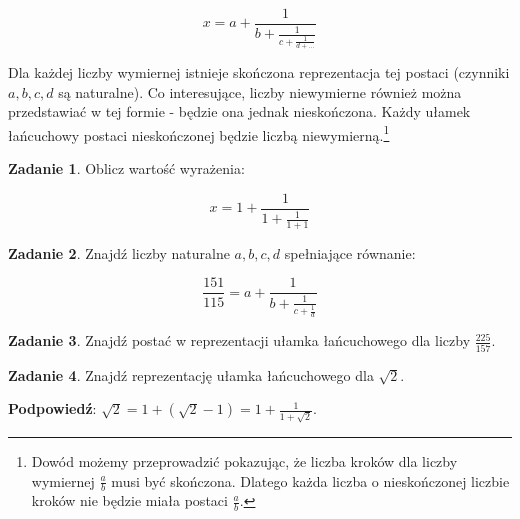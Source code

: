 \documentclass[11pt]{article}
\theoremstyle{definition}
\newtheorem{zad}{Zadanie}
\begin{document}
$$ x = a + \frac{1}{b+\frac{1}{c+\frac1{d+...}}}$$

Dla każdej liczby wymiernej istnieje skończona reprezentacja tej postaci (czynniki $a,b,c,d$ są naturalne). Co interesujące, liczby niewymierne również można przedstawiać w tej formie - będzie ona jednak nieskończona. Każdy ułamek łańcuchowy postaci nieskończonej będzie liczbą niewymierną.\footnote{Dowód możemy przeprowadzić pokazując, że liczba kroków dla liczby wymiernej $\frac{a}{b}$ musi być skończona. Dlatego każda liczba o nieskończonej liczbie kroków nie będzie miała postaci $\frac ab$.}

\begin{zad}
Oblicz wartość wyrażenia:

$$x = 1+\frac1{1+\frac1{1+1}}$$
\end{zad}

\begin{zad}
Znajdź liczby naturalne $a,b,c,d$ spełniające równanie:

$$\frac{151}{115}=a+\frac1{b+\frac1{c+\frac1d}}$$
\end{zad}
\begin{zad}
Znajdź postać w reprezentacji ułamka łańcuchowego dla liczby $\frac{225}{157}$.
\end{zad}

\begin{zad}
Znajdź reprezentację ułamka łańcuchowego dla $\sqrt{2}$.

\textbf{Podpowiedź}: $\sqrt{2} = 1 + (\sqrt{2}-1) = 1+\frac1{1+\sqrt{2}}$.
\end{zad}

%
%
\end{document}
